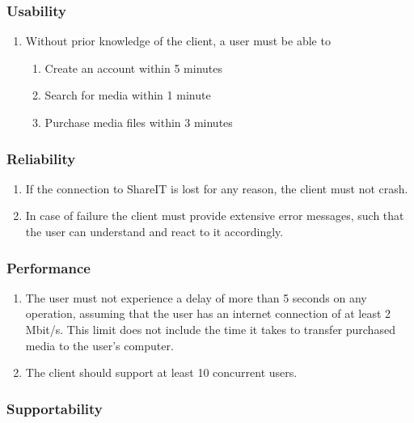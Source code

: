%

\subsubsection{Usability}

\begin{enumerate}[label=NFR-\twodigits*]
\item Without prior knowledge of the client, a user must be able to
	\begin{enumerate}
	\item{Create an account within 5 minutes}
	\item Search for media within 1 minute
	\item Purchase media files within 3 minutes
	\end{enumerate}
\end{enumerate}

\subsubsection{Reliability}

\begin{enumerate}[label=NFR-\twodigits*, resume]
\item If the connection to ShareIT is lost for any reason, the client must not crash. 
\item In case of failure the client must provide extensive error messages, such that the user can understand and react to it accordingly.
\end{enumerate}

\subsubsection{Performance}

\begin{enumerate}[label=NFR-\twodigits*, resume]
\item The user must not experience a delay of more than 5 seconds on any operation, assuming that the user has an internet connection of at least 2 Mbit/s. This limit does not include the time it takes to transfer purchased media to the user's computer.
\item The client should support at least 10 concurrent users. 
\end{enumerate}

\subsubsection{Supportability}

